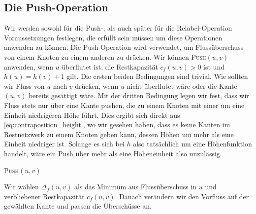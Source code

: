 \documentclass[12pt,a4paper,titlepage,onecolumn,ngerman,bibliography=totocnumbered]{scrartcl}
\theoremstyle{definition}
\theoremstyle{remark}
\begin{document}
\subsection{Die Push-Operation}
Wir werden sowohl für die Push-, als auch später für die Relabel-Operation Voraussetzungen festlegen, die erfüllt sein müssen um diese Operationen anwenden zu können.
Die Push-Operation wird verwendet, um Flussüberschuss von einem Knoten zu einem anderen zu drücken.
Wir können \textsc{Push}$(u,v)$ anwenden, wenn $u$ überflutet ist, die Restkapazität $c_f(u,v) > 0$ ist und $h(u) = h(v) + 1$ gilt.
Die ersten beiden Bedingungen sind trivial.
Wie sollten wir Fluss von $u$ nach $v$ drücken, wenn $u$ nicht überflutet wäre oder die Kante $(u,v)$ bereits gesättigt wäre.
Mit der dritten Bedingung legen wir fest, dass wir Fluss stets nur über eine Kante pushen, die zu einem Knoten mit einer um eine Einheit niedrigeren Höhe führt.
Dies ergibt sich direkt aus \eqref{eq:contraposition_height}, wo wir gesehen haben, dass es keine Kanten im Restnetzwerk zu einem Knoten geben kann, dessen Höhen um mehr als eine Einheit niedriger ist.
Solange es sich bei $h$ also tatsächlich um eine Höhenfunktion handelt, wäre ein Push über mehr als eine Höheneinheit also unzulässig.
\begin{algorithm}[H]
	\caption{\textsc{Push}$(u,v)$}
	\label{alg:push}
	\begin{algorithmic}[1]
		\State{}
		\Else
		\EndIf
	\end{algorithmic}
\end{algorithm}
Wir wählen $\Delta_{f}(u,v)$ als das Minimum aus Flussüberschuss in $u$ und verbliebener Restkapazität $c_f(u,v)$.
Danach verändern wir den Vorfluss auf der gewählten Kante und passen die Überschüsse an.
\end{document}
